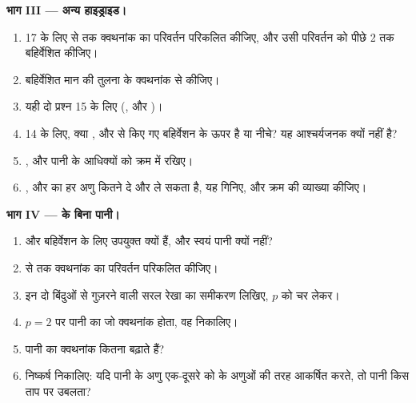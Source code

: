 \begin{problem}
\medskip
\noindent\textbf{भाग III --- अन्य हाइड्राइड।}
\begin{enumerate}[resume]
  \item {} 17 के लिए  से
         तक क्वथनांक का परिवर्तन परिकलित कीजिए, और उसी परिवर्तन को पीछे  2 तक बहिर्वेशित कीजिए।
  \item बहिर्वेशित मान की तुलना  के क्वथनांक से कीजिए।
  \item यही दो प्रश्न  15 के लिए (,  और
        )।
  \item {} 14 के लिए, क्या ,  और  से किए गए
        बहिर्वेशन के ऊपर है या नीचे? यह आश्चर्यजनक क्यों नहीं है?
  \item {},  और पानी के आधिक्यों को क्रम में रखिए।
  \item {},  और
         का हर अणु कितने  दे और ले सकता है, यह गिनिए, और क्रम की व्याख्या कीजिए।
\end{enumerate}

\medskip
\noindent\textbf{भाग IV ---  के बिना पानी।}
\begin{enumerate}[resume]
  \item {} और  बहिर्वेशन के लिए उपयुक्त क्यों हैं, और
        स्वयं पानी क्यों नहीं?
  \item {} से  तक क्वथनांक का परिवर्तन परिकलित कीजिए।
  \item इन दो बिंदुओं से गुज़रने वाली सरल रेखा का समीकरण लिखिए,
         $p$ को चर लेकर।
  \item $p = 2$ पर पानी का जो क्वथनांक होता, वह निकालिए।
  \item {} पानी का क्वथनांक कितना बढ़ाते हैं?
  \item निष्कर्ष निकालिए: यदि पानी के अणु एक-दूसरे को  के अणुओं की तरह
        आकर्षित करते, तो पानी किस ताप पर उबलता?
\end{enumerate}
\end{problem}
